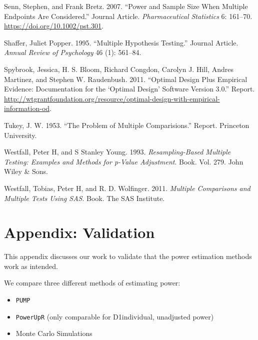 \documentclass[
]{article}
\providecommand{\tightlist}{%
  \setlength{\itemsep}{0pt}\setlength{\parskip}{0pt}}
\newlength{\cslhangindent}
\newlength{\cslentryspacingunit} %
\newenvironment{CSLReferences}[2] %
 {%
  \setlength{\parindent}{0pt}
  \ifodd #1
  \let\oldpar\par
  \def\par{\hangindent=\cslhangindent\oldpar}
  \fi
  \setlength{\parskip}{#2\cslentryspacingunit}
 }%
 {}
\begin{document}
\begin{CSLReferences}{1}{0}
\leavevmode{}%
Senn, Stephen, and Frank Bretz. 2007. {``Power and Sample Size When
Multiple Endpoints Are Considered.''} Journal Article.
\emph{Pharmaceutical Statistics} 6: 161--70.
\url{https://doi.org/10.1002/pst.301}.

\leavevmode{}%
Shaffer, Juliet Popper. 1995. {``Multiple Hypothesis Testing.''} Journal
Article. \emph{Annual Review of Psychology} 46 (1): 561--84.

\leavevmode{}%
Spybrook, Jessica, H. S. Bloom, Richard Congdon, Carolyn J. Hill, Andres
Martinez, and Stephen W. Raudenbush. 2011. {``Optimal Design Plus
Empirical Evidence: Documentation for the {`Optimal Design'} Software
Version 3.0.''} Report.
\url{http://wtgrantfoundation.org/resource/optimal-design-with-empirical-information-od}.

\leavevmode{}%
Tukey, J. W. 1953. {``The Problem of Multiple Comparisions.''} Report.
Princeton University.

\leavevmode{}%
Westfall, Peter H, and S Stanley Young. 1993. \emph{Resampling-Based
Multiple Testing: Examples and Methods for p-Value Adjustment}. Book.
Vol. 279. John Wiley \& Sons.

\leavevmode{}%
Westfall, Tobias, Peter H, and R. D. Wolfinger. 2011. \emph{Multiple
Comparisons and Multiple Tests Using SAS}. Book. The SAS Institute.

\end{CSLReferences}

\section{Appendix: Validation}

This appendix discusses our work to validate that the power estimation
methods work as intended.

We compare three different methods of estimating power:

\begin{itemize}
\tightlist
\item
  \texttt{PUMP}
\item
  \texttt{PowerUpR} (only comparable for D1individual, unadjusted power)
\item
  Monte Carlo Simulations
\end{itemize}
\end{document}
